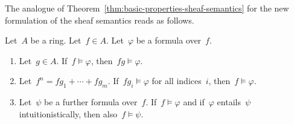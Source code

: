 \documentclass{ws-rv9x6}
\begin{document}
{\begin{table}[ht]
  \label{table:algebraic-kripke-joyal}
\end{table}

The analogue of Theorem~\ref{thm:basic-properties-sheaf-semantics} for the new
formulation of the sheaf semantics reads as follows.

\begin{theorem}\label{thm:basic-properties-sheaf-semantics-algebraic}
Let~$A$ be a ring. Let~$f \in A$. Let~$\varphi$ be a formula over~$f$.
\begin{enumerate}
\item Let~$g \in A$. If~$f \models \varphi$, then~$fg \models \varphi$.
\item Let~$f^n = fg_1 + \cdots + fg_m$. If~$fg_i \models \varphi$ for all
indices~$i$, then~$f \models \varphi$.
\item Let~$\psi$ be a further formula over~$f$. If~$f \models
\varphi$ and if~$\varphi$ entails~$\psi$ intuitionistically, then also~$f
\models \psi$.
\end{enumerate}
\end{theorem}

}
\end{document}
